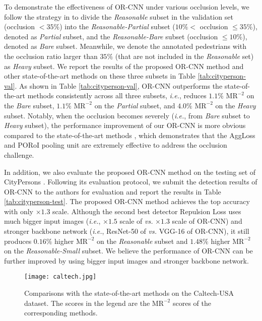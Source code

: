\documentclass[runningheads]{llncs}
\def\ie{{\em i.e.}}
\begin{document}
To demonstrate the effectiveness of OR-CNN under various occlusion levels, we follow the strategy in \cite{DBLP:journals/corr/abs-1711-07752} to divide the {\em Reasonable} subset in the validation set (occlusion $<35\%$) into the {\em Reasonable-Partial} subset ($10\%<$ occlusion $\le35\%$), denoted as {\em Partial} subset, and the {\em Reasonable-Bare} subset (occlusion $\le10\%$), denoted as {\em Bare} subset. Meanwhile, we denote the annotated pedestrians with the occlusion ratio larger than $35\%$ (that are not included in the {\em Reasonable} set) as {\em Heavy} subset. We report the results of the proposed OR-CNN method and other state-of-the-art methods \cite{DBLP:journals/corr/abs-1711-07752,DBLP:conf/cvpr/ZhangBS17} on these three subsets in Table \ref{tab:cityperson-val}. As shown in Table \ref{tab:cityperson-val}, OR-CNN outperforms the state-of-the-art methods consistently across all three subsets, \ie, reduces $1.1\%$ $\text{MR}^{-2}$ on the {\em Bare} subset, $1.1\%$ $\text{MR}^{-2}$ on the {\em Partial} subset, and $4.0\%$ $\text{MR}^{-2}$ on the {\em Heavy} subset. Notably, when the occlusion becomes severely (\ie, from {\em Bare} subset to {\em Heavy} subset), the performance improvement of our OR-CNN is more obvious compared to the state-of-the-art methods \cite{DBLP:journals/corr/abs-1711-07752,DBLP:conf/cvpr/ZhangBS17}, which demonstrates that the AggLoss and PORoI pooling unit are extremely effective to address the occlusion challenge.

In addition, we also evaluate the proposed OR-CNN method on the testing set of CityPersons \cite{DBLP:conf/cvpr/ZhangBS17}. Following its evaluation protocol, we submit the detection results of OR-CNN to the authors for evaluation and report the results in Table \ref{tab:cityperson-test}. The proposed OR-CNN method achieves the top accuracy with only $\times1.3$ scale. Although the second best detector Repulsion Loss \cite{DBLP:journals/corr/abs-1711-07752} uses much bigger input images (\ie, $\times1.5$ scale of \cite{DBLP:journals/corr/abs-1711-07752} {\em vs.} $\times1.3$ scale of OR-CNN) and stronger backbone network (\ie, ResNet-50 of \cite{DBLP:journals/corr/abs-1711-07752} {\em vs.} VGG-16 of OR-CNN), it still produces $0.16\%$ higher $\text{MR}^{-2}$ on the {\em Reasonable} subset and $1.48\%$ higher $\text{MR}^{-2}$ on the {\em Reasonable-Small} subset. We believe the performance of  OR-CNN can be further improved by using bigger input images and stronger backbone network.

\begin{figure*}[t]
\centering
\texttt{[image: caltech.jpg]}
\caption{Comparisons with the state-of-the-art methods on the Caltech-USA dataset. The scores in the legend are the ${\text{MR}}^{-2}$ scores of the corresponding methods.}
\label{fig:caltech}
\end{figure*}
\end{document}

